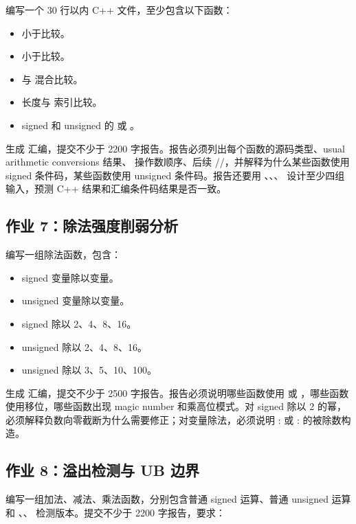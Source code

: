 \begin{exercisebox}
编写一个 30 行以内 C++ 文件，至少包含以下函数：

\begin{itemize}
  \item {} 小于比较。
  \item {} 小于比较。
  \item {} 与  混合比较。
  \item {} 长度与  索引比较。
  \item signed 和 unsigned 的  或 。
\end{itemize}

生成  汇编，提交不少于 2200 字报告。报告必须列出每个函数的源码类型、usual arithmetic conversions 结果、 操作数顺序、后续 //，并解释为什么某些函数使用 signed 条件码，某些函数使用 unsigned 条件码。报告还要用 、、、 设计至少四组输入，预测 C++ 结果和汇编条件码结果是否一致。

\subsection*{作业 7：除法强度削弱分析}

编写一组除法函数，包含：

\begin{itemize}
  \item signed 变量除以变量。
  \item unsigned 变量除以变量。
  \item signed 除以 2、4、8、16。
  \item unsigned 除以 2、4、8、16。
  \item unsigned 除以 3、5、10、100。
\end{itemize}

生成  汇编，提交不少于 2500 字报告。报告必须说明哪些函数使用  或 ，哪些函数使用移位，哪些函数出现 magic number 和乘高位模式。对 signed 除以 2 的幂，必须解释负数向零截断为什么需要修正；对变量除法，必须说明 : 或 : 的被除数构造。

\subsection*{作业 8：溢出检测与 UB 边界}

编写一组加法、减法、乘法函数，分别包含普通 signed 运算、普通 unsigned 运算和 、、 检测版本。提交不少于 2200 字报告，要求：


\end{exercisebox}
